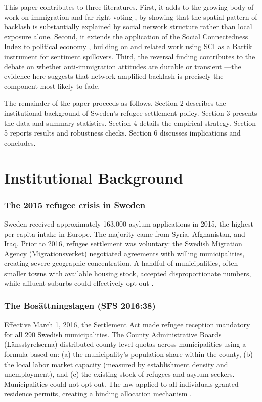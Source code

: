 \documentclass[12pt]{article}
\begin{document}
This paper contributes to three literatures. First, it adds to the growing body of work on immigration and far-right voting \citep{dustmann2019refugee, halla2017immigration, steinmayr2021contact, tabellini2020gifts, edo2019immigration}, by showing that the spatial pattern of backlash is substantially explained by social network structure rather than local exposure alone. Second, it extends the application of the Social Connectedness Index to political economy \citep{bailey2018social, bailey2020determinants}, building on \citet{steinert2022social} and related work using SCI as a Bartik instrument for sentiment spillovers. Third, the reversal finding contributes to the debate on whether anti-immigration attitudes are durable or transient \citep{allport1954nature, paluck2019contact, alesina2023immigration}---the evidence here suggests that network-amplified backlash is precisely the component most likely to fade.

The remainder of the paper proceeds as follows. Section 2 describes the institutional background of Sweden's refugee settlement policy. Section 3 presents the data and summary statistics. Section 4 details the empirical strategy. Section 5 reports results and robustness checks. Section 6 discusses implications and concludes.


\section{Institutional Background}

\subsubsection*{The 2015 refugee crisis in Sweden} Sweden received approximately 163{,}000 asylum applications in 2015, the highest per-capita intake in Europe. The majority came from Syria, Afghanistan, and Iraq. Prior to 2016, refugee settlement was voluntary: the Swedish Migration Agency (Migrationsverket) negotiated agreements with willing municipalities, creating severe geographic concentration. A handful of municipalities, often smaller towns with available housing stock, accepted disproportionate numbers, while affluent suburbs could effectively opt out \citep{andersson2010segregation}.

\subsubsection*{The Bos\"{a}ttningslagen (SFS 2016:38)} Effective March 1, 2016, the Settlement Act made refugee reception mandatory for all 290 Swedish municipalities. The County Administrative Boards (L\"{a}nsstyrelserna) distributed county-level quotas across municipalities using a formula based on: (a) the municipality's population share within the county, (b) the local labor market capacity (measured by establishment density and unemployment), and (c) the existing stock of refugees and asylum seekers. Municipalities could not opt out. The law applied to all individuals granted residence permits, creating a binding allocation mechanism \citep{riksdagen2016bosattningslagen}.
\end{document}
